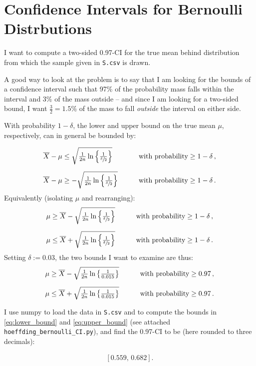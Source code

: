 \section{Confidence Intervals for Bernoulli Distrbutions}

I want to compute a two-sided 0.97-CI for the true mean behind distribution from
which the sample given in \texttt{S.csv} is drawn.

A good way to look at the problem is to say that I am looking for the bounds of
a confidence interval such that 97\% of the probability mass falls within the
interval and 3\% of the mass outside -- and since I am looking for a two-sided
bound, I want $\tfrac{3}{2} = 1.5$\% of the mass to fall \textit{outside} the
interval on either side.

With probability $1 - \delta$, the lower and upper bound on the true mean $\mu$,
respectively, can in general be bounded by:

\begin{alignat*}{3}
  \overline{X} - \mu &\leq \sqrt{
    \tfrac{1}{2n}\ln \left\{\tfrac{1}{\sfrac{\delta}{2}}\right\}} \qquad &&\text{with probability} \geq
  1 - \delta\, ,\\[6pt]
  \overline{X} - \mu &\geq - \sqrt{
    \tfrac{1}{2n}\ln \left\{\tfrac{1}{\sfrac{\delta}{2}}\right\}} \qquad &&\text{with probability} \geq
  1 - \delta\, .
\end{alignat*}
Equivalently (isolating $\mu$ and rearranging):
\begin{alignat*}{3}
  \mu &\geq \overline{X} - \sqrt{
    \tfrac{1}{2n}\ln \left\{\tfrac{1}{\sfrac{\delta}{2}}\right\}} \qquad &&\text{with probability} \geq
  1 - \delta\, ,\\[6pt]
  \mu &\leq \overline{X} + \sqrt{
    \tfrac{1}{2n}\ln \left\{\tfrac{1}{\sfrac{\delta}{2}}\right\}} \qquad &&\text{with probability} \geq
  1 - \delta\, .
\end{alignat*}
Setting $\delta := 0.03$, the two bounds I want to examine are thus:
\begin{alignat}{3}
  \mu &\geq \overline{X} - \sqrt{
    \tfrac{1}{2n}\ln \left\{\tfrac{1}{0.015}\right\}} \qquad &&\text{with probability} \geq
  0.97\, ,\label{eq:lower_bound}\\[6pt]
  \mu &\leq \overline{X} + \sqrt{
    \tfrac{1}{2n}\ln \left\{\tfrac{1}{0.015}\right\}} \qquad &&\text{with probability} \geq
  0.97\, .\label{eq:upper_bound}
\end{alignat}

I use numpy to load the data in \texttt{S.csv} and to compute the bounds in
\cref{eq:lower_bound} and \cref{eq:upper_bound} (see attached
\texttt{hoeffding\_bernoulli\_CI.py}), and find the 0.97-CI to be (here rounded to
three decimals):

\begin{align*}
  \left[0.559,\, 0.682\right] .
\end{align*}

\sectend
\newpage
